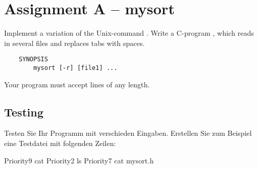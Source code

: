 




\section*{Assignment A -- mysort}

Implement a variation of the Unix-command .
Write a C-program ,
which reads in several files and replaces tabs with spaces.

\begin{verbatim}
    SYNOPSIS
        mysort [-r] [file1] ...
\end{verbatim}


Your program must accept lines of any length.

\subsection*{Testing}

Testen Sie Ihr Programm mit verschieden Eingaben. Erstellen Sie zum Beispiel
eine Testdatei  mit folgenden Zeilen:

\begin{osuefmtcode}
  Priority9 cat
  Priority2 ls
  Priority7 cat mysort.h
\end{osuefmtcode}

